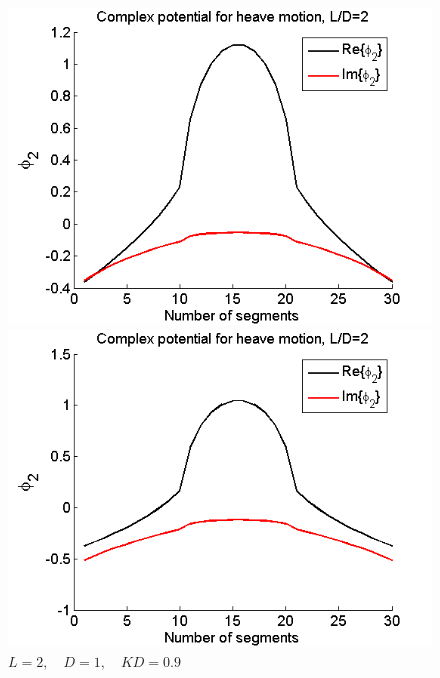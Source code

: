 \documentclass[a4paper,10pt]{article}
\begin{document}
\begin{figure}[H]
  \includegraphics[width=\linewidth]{phi2_box1_12.png}
  \caption{$L = 2 , \quad D = 1 , \quad K D = 1.2$}\label{box1_1.2}
\endminipage\hfill
{}
  \includegraphics[width=\linewidth]{phi2_box1_09.png}
  \caption{$L = 2 , \quad D = 1 , \quad K D = 0.9$}\label{box1_0.9}
\endminipage
\end{figure}
\end{document}
